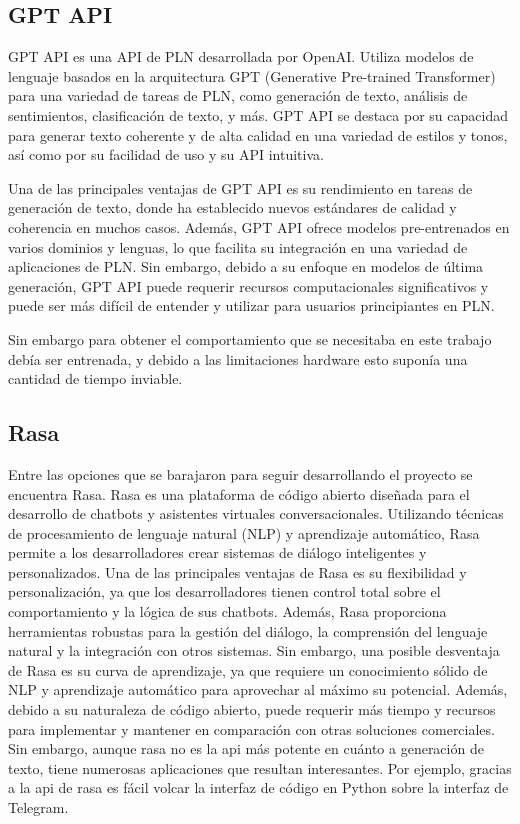\subsection{GPT API}

GPT API es una API de PLN desarrollada por OpenAI. Utiliza modelos de lenguaje basados en la arquitectura GPT (Generative Pre-trained Transformer) para una variedad de tareas de PLN, como generación de texto, análisis de sentimientos, clasificación de texto, y más. GPT API se destaca por su capacidad para generar texto coherente y de alta calidad en una variedad de estilos y tonos, así como por su facilidad de uso y su API intuitiva.

Una de las principales ventajas de GPT API es su rendimiento en tareas de generación de texto, donde ha establecido nuevos estándares de calidad y coherencia en muchos casos. Además, GPT API ofrece modelos pre-entrenados en varios dominios y lenguas, lo que facilita su integración en una variedad de aplicaciones de PLN. Sin embargo, debido a su enfoque en modelos de última generación, GPT API puede requerir recursos computacionales significativos y puede ser más difícil de entender y utilizar para usuarios principiantes en PLN.

Sin embargo para obtener el comportamiento que se necesitaba en este trabajo debía ser entrenada, y debido a las limitaciones hardware esto suponía una cantidad de tiempo inviable. 

\subsection{Rasa}
Entre las opciones que se barajaron para seguir desarrollando el proyecto se encuentra Rasa. Rasa es una plataforma de código abierto diseñada para el desarrollo de chatbots y asistentes virtuales conversacionales. Utilizando técnicas de procesamiento de lenguaje natural (NLP) y aprendizaje automático, Rasa permite a los desarrolladores crear sistemas de diálogo inteligentes y personalizados. Una de las principales ventajas de Rasa es su flexibilidad y personalización, ya que los desarrolladores tienen control total sobre el comportamiento y la lógica de sus chatbots. Además, Rasa proporciona herramientas robustas para la gestión del diálogo, la comprensión del lenguaje natural y la integración con otros sistemas. Sin embargo, una posible desventaja de Rasa es su curva de aprendizaje, ya que requiere un conocimiento sólido de NLP y aprendizaje automático para aprovechar al máximo su potencial. Además, debido a su naturaleza de código abierto, puede requerir más tiempo y recursos para implementar y mantener en comparación con otras soluciones comerciales. Sin embargo, aunque rasa no es la api más potente en cuánto a generación de texto, tiene numerosas aplicaciones que resultan interesantes. Por ejemplo, gracias a la api de rasa es fácil volcar la interfaz de código en Python sobre la interfaz de Telegram. 

